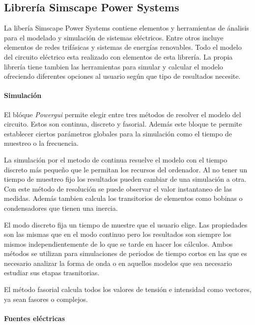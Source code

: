 \documentclass{book}
\begin{document}
		\subsection{Librer\'ia Simscape Power Systems}

La liber\'ia Simscape Power Systems contiene elementos y herramientas de \'analisis para el modelado y simulaci\'on de sistemas el\'ectricos. Entre otros incluye elementos de redes trif\'asicas y sistemas de energ\'ias renovables. Todo el modelo del circuito el\'ectrico esta realizado con elementos de esta librer\'ia. La propia librer\'ia tiene tambien las herramientas para simular y calcular el modelo ofreciendo diferentes opciones al usuario seg\'un que tipo de resultados necesite. \par

		\paragraph {Simulaci\'on}
El bl\'oque \emph{Powergui} permite elegir entre tres m\'etodos de resolver el modelo del circuito. Estos son continua, discreto y fasorial. Adem\'as este bloque te permite establecer ciertos par\'ametros globales para la simulaci\'on como el tiempo de muestreo o la frecuencia.  \par

La simulaci\'on por el metodo de continua resuelve el modelo con el tiempo discreto m\'as pequeño que le permitan los recursos del ordenador. Al no tener un tiempo de muestreo fijo los resultados pueden cambiar de una simulaci\'on a otra. Con este m\'etodo de resoluci\'on se puede observar el valor instantaneo de las medidas. Adem\'as tambien calcula  los transitorios de elementos como bobinas o condensadores que tienen una inercia. \par

El modo discreto fija un tiempo de muestre que el usuario elige. Las propiedades son las mismas que en el modo continuo pero los resultados son siempre los mismos independientemente de lo que se tarde en hacer los c\'alculos. Ambos m\'etodos se utilizan para simulaciones de periodos de tiempo cortos en las que es necesario analizar la forma de onda o en aquellos modelos que sea necesario estudiar sus etapas trasnitorias. \par

El m\'etodo fasorial calcula todos los valores de tensi\'on e intensidad como vectores, ya sean fasores o complejos. 

		\paragraph {Fuentes el\'ectricas}
\end{document}
